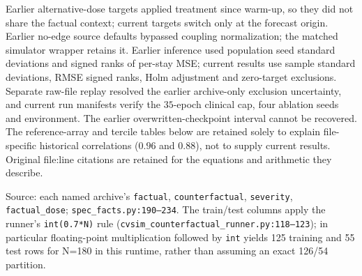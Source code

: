 Earlier alternative-dose targets applied treatment since warm-up, so they did not share the factual context; current targets switch only at the forecast origin. Earlier no-edge source defaults bypassed coupling normalization; the matched simulator wrapper retains it. Earlier inference used population seed standard deviations and signed ranks of per-stay MSE; current results use sample standard deviations, RMSE signed ranks, Holm adjustment and zero-target exclusions. Separate raw-file replay resolved the earlier archive-only exclusion uncertainty, and current run manifests verify the $35$-epoch clinical cap, four ablation seeds and environment. The earlier overwritten-checkpoint interval cannot be recovered. The reference-array and tercile tables below are retained solely to explain file-specific historical correlations ($0.96$ and $0.88$), not to supply current results. Original file:line citations are retained for the equations and arithmetic they describe.
\begin{center}
\small
{}
\ifdim\wd0>\textwidth\resizebox{\textwidth}{!}{\usebox0}\else\usebox0\fi
\end{center}


Source: each named archive’s \texttt{factual}, \texttt{counterfactual}, \texttt{severity}, \texttt{factual\_\allowbreak{}dose}; \texttt{spec\_\allowbreak{}facts.\allowbreak{}py:\allowbreak{}190–\allowbreak{}234}. The train/test columns apply the runner’s \texttt{int(0.\allowbreak{}7*N)} rule (\texttt{cvsim\_\allowbreak{}counterfactual\_\allowbreak{}runner.\allowbreak{}py:\allowbreak{}118–\allowbreak{}123}); in particular floating-point multiplication followed by \texttt{int} yields 125 training and 55 test rows for N=180 in this runtime, rather than assuming an exact 126/54 partition.

